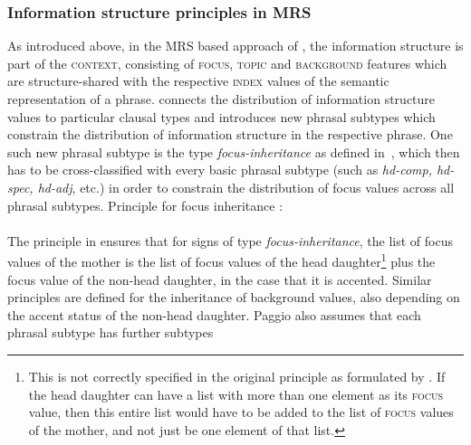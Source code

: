 \documentclass[output=paper
 	        ,biblatex
                ,babelshorthands
                ,newtxmath
                ,draftmode
                ,colorlinks, citecolor=brown
]{langscibook}
\begin{document}
\subsubsection{Information structure principles in MRS}

As introduced above, in the MRS based approach of \cite{Paggio2009a-u}, the
information structure is part of the \textsc{context}, consisting of
\textsc{focus}, \textsc{topic} and \textsc{background} features which
are structure-shared with the respective \textsc{index} values of the
semantic representation of a phrase. \cite{Paggio2009a-u} connects the
distribution of information structure values to particular clausal
types and introduces new phrasal subtypes which constrain the
distribution of information structure in the respective phrase. One
such new phrasal subtype is the type
\textit{focus-inheritance} as defined in~, which then has to be cross-classified
with every basic phrasal subtype (such as \textit{hd-comp, hd-spec,
  hd-adj}, etc.) in order to constrain the distribution of focus
values across all phrasal subtypes.
\ea
Principle for focus inheritance \citep[155]{Paggio2009a-u}:\\
   \impl \\
    \label{fig:focus-inheritance}
    \z
The principle in  ensures that for
signs of type \textit{focus-inheritance}, the list of focus values
of the mother is the list of focus values of the head
daughter\footnote{This is not correctly specified in the original
principle as formulated by \citet{Paggio2009a-u}. If the
head daughter can have a list with more than one element as its
\textsc{focus} value, then this entire list would have to be
added to the list of \textsc{focus} values of the mother, and
not just be one element of that list.} plus the focus value of
the non-head daughter, in the case that it is accented. Similar principles
are defined for the inheritance of background values, also
depending on the accent status of the non-head daughter. Paggio
also assumes that each phrasal subtype has further subtypes
\end{document}
